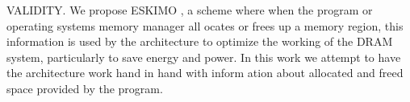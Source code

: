 VALIDITY.\cite{eskimo}
We propose ESKIMO , a scheme where when the program or operating systems memory manager all ocates or
frees up a memory region, this information is used by the architecture to optimize the working of the DRAM system, particularly to save energy and power. In this work we attempt to have the architecture work hand in hand with inform ation about allocated and freed space provided by the program. 